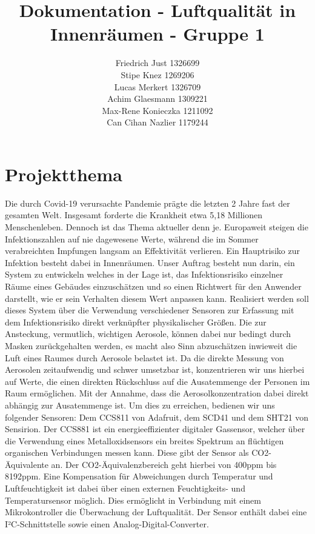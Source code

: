 \documentclass[]{article}
\title{Dokumentation - Luftqualität in Innenräumen - Gruppe 1}
\author{Friedrich Just 1326699 \\ Stipe Knez 1269206 \\ Lucas Merkert 1326709 \\ Achim Glaesmann 1309221 \\ Max-Rene Konieczka 1211092 \\ Can Cihan Nazlier 1179244}
\begin{document}
	\begin{titlepage}
		\maketitle
		\thispagestyle{empty}
	\end{titlepage}
	\tableofcontents
	\setcounter{page}{1}
	\newpage
	
	
	\section{Projektthema}
	Die durch Covid-19 verursachte Pandemie prägte die letzten 2 Jahre fast der gesamten Welt. Insgesamt forderte die Krankheit etwa 5,18 Millionen Menschenleben. Dennoch ist das Thema aktueller denn je. Europaweit steigen die Infektionszahlen auf nie dagewesene Werte, während die im Sommer verabreichten Impfungen langsam an Effektivität verlieren. Ein Hauptrisiko zur Infektion besteht dabei in Innenräumen. Unser Auftrag besteht nun darin, ein System zu entwickeln welches in der Lage ist, das Infektionsrisiko einzelner Räume eines Gebäudes einzuschätzen und so einen Richtwert für den Anwender darstellt, wie er sein Verhalten diesem Wert anpassen kann. Realisiert werden soll dieses System über die Verwendung verschiedener Sensoren zur Erfassung mit dem Infektionsrisiko direkt verknüpfter physikalischer Größen. Die zur Ansteckung, vermutlich, wichtigen Aerosole, können dabei nur bedingt durch Masken zurückgehalten werden, es macht also Sinn abzuschätzen inwieweit die Luft eines Raumes durch Aerosole belastet ist. Da die direkte Messung von Aerosolen zeitaufwendig und schwer umsetzbar ist, konzentrieren wir uns hierbei auf Werte, die einen direkten Rückschluss auf die Ausatemmenge der Personen im Raum ermöglichen. Mit der Annahme, dass die Aerosolkonzentration dabei direkt abhängig zur Ausatemmenge ist.\newline
	Um dies zu erreichen, bedienen wir uns folgender Sensoren: Dem CCS811 von Adafruit, dem SCD41 und dem SHT21 von Sensirion. Der CCS881 ist ein energieeffizienter digitaler Gassensor, welcher über die Verwendung eines Metalloxidsensors ein breites Spektrum an flüchtigen organischen Verbindungen messen kann. Diese gibt der Sensor als CO2-Äquivalente an. Der CO2-Äquivalenzbereich geht hierbei von 400ppm bis 8192ppm. Eine Kompensation für Abweichungen durch Temperatur und Luftfeuchtigkeit ist dabei über einen externen Feuchtigkeits- und Temperatursensor möglich. Dies ermöglicht in Verbindung mit einem Mikrokontroller die Überwachung der Luftqualität. Der Sensor enthält dabei eine I²C-Schnittstelle sowie einen Analog-Digital-Converter.
\end{document}
